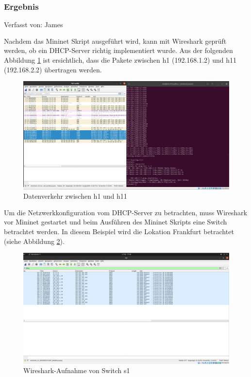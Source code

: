 \documentclass[fontsize=12pt,paper=a4,open=any,parskip=half,
  twoside=false,toc=listof,toc=bibliography,fleqn,leqno,
  captions=nooneline,captions=tableabove,british]{scrbook}
\begin{document}
\subsubsection{Ergebnis}
{\tiny Verfasst von: James\par}
Nachdem das Mininet Skript ausgeführt wird, kann mit Wireshark geprüft werden, ob ein DHCP-Server richtig implementiert wurde. Aus der folgenden Abbildung \ref{wireshark} ist ersichtlich, dass die Pakete zwischen h1 (192.168.1.2) und h11 (192.168.2.2) übertragen werden.
\begin{figure}[H]
 \centering
 \includegraphics[width=1.0\textwidth]{Bilder/wireshark2}
 \captionsetup{justification=centering}
 \caption{Datenverkehr zwischen h1 und h11}
 \label{wireshark}
\end{figure}

Um die Netzwerkkonfiguration vom DHCP-Server zu betrachten, muss Wireshark vor Mininet gestartet und beim Ausführen des Mininet Skripts eine Switch betrachtet werden. In diesem Beispiel wird die Lokation Frankfurt betrachtet (siehe Abbildung \ref{s11}).

\begin{figure}[H]
 \centering
 \includegraphics[width=1.0\textwidth]{Bilder/s1}
 \captionsetup{justification=centering}
 \caption{Wireshark-Aufnahme von Switch s1}
 \label{s11}
\end{figure}
\end{document}
